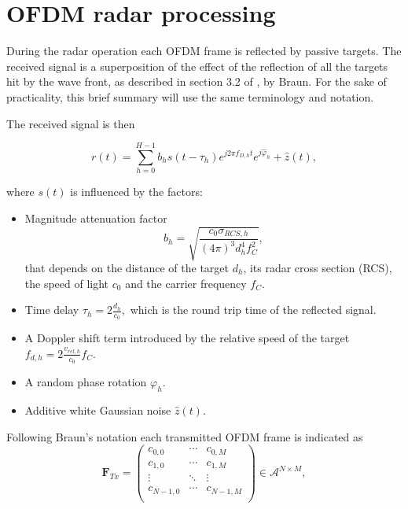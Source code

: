 \section{OFDM radar processing}
        
    During the radar operation each OFDM frame is reflected by passive targets. The received signal is a superposition of the effect of the reflection of all the targets hit by the wave front, as described in section 3.2 of \cite{Braun2014OFDMRA}, by Braun. For the sake of practicality, this brief summary will use the same terminology and notation.
    
    The received signal is then
    
    \begin{equation}
    \label{eq:received_signal_mltiple_targets}
        r(t) = \sum_{h=0}^{H-1} b_h s(t-\tau_h)e^{j2\pi f_{D,h}t}e^{j\hat{\varphi}_h} + \hat{z}(t),
    \end{equation}
    
    where $s(t)$ is influenced by the factors:
    
    \begin{itemize}
        \item Magnitude attenuation factor $$b_h = \sqrt{\frac{c_0\sigma_{RCS,h}}{(4\pi)^3 d_h^4f_C^2}},$$
    that depends on the distance of the target $d_h$, its radar cross section (RCS), the speed of light $c_0$ and the carrier frequency $f_C$.
    
        \item Time delay $\tau_h = 2\frac{d_h}{c_0},$ which is the round trip time of the reflected signal.
    
        \item A Doppler shift term introduced by the relative speed of the target $f_{d,h} = 2 \frac{v_{rel,h}}{c_0}f_C$.
        \item A random phase rotation $\varphi_h$.
        \item Additive white Gaussian noise $\hat{z}(t)$.
    \end{itemize}
    
    Following Braun's notation each transmitted OFDM frame is indicated as
    \begin{equation}
        \mathbf F_{Tx} = \begin{pmatrix}
            c_{0,0} & \cdots & c_{0,M} \\
            c_{1,0} & \cdots & c_{1,M} \\
            \vdots   & \ddots & \vdots \\
            c_{N-1, 0} & \cdots & c_{N-1, M} \\
        \end{pmatrix} \in \mathcal{A}^{N\times M},
    \end{equation}
    
